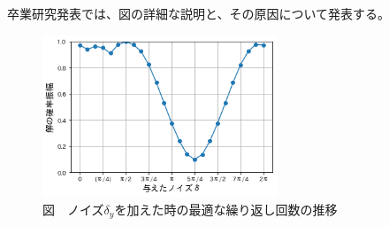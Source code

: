 \documentclass[platex,dvipdfmx, twocolumn]{jsarticle}			%
\begin{document}
卒業研究発表では、図の詳細な説明と、その原因について発表する。

\begin{figure}
\centering
\includegraphics[width=70mm]{figures/sample.png}
\caption*{図　ノイズ$\delta_y$を加えた時の最適な繰り返し回数の推移}
\label{fig:P(k)}
\end{figure}



\end{document}
